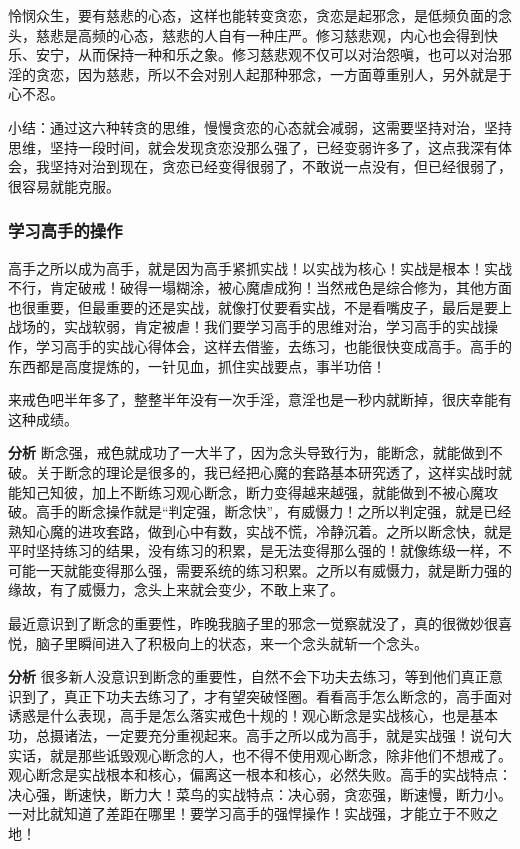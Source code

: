 怜悯众生，要有慈悲的心态，这样也能转变贪恋，贪恋是起邪念，是低频负面的念头，慈悲是高频的心态，慈悲的人自有一种庄严。修习慈悲观，内心也会得到快乐、安宁，从而保持一种和乐之象。修习慈悲观不仅可以对治怨嗔，也可以对治邪淫的贪恋，因为慈悲，所以不会对别人起那种邪念，一方面尊重别人，另外就是于心不忍。

小结：通过这六种转贪的思维，慢慢贪恋的心态就会减弱，这需要坚持对治，坚持思维，坚持一段时间，就会发现贪恋没那么强了，已经变弱许多了，这点我深有体会，我坚持对治到现在，贪恋已经变得很弱了，不敢说一点没有，但已经很弱了，很容易就能克服。

\subsubsection{学习高手的操作}

高手之所以成为高手，就是因为高手紧抓实战！以实战为核心！实战是根本！实战不行，肯定破戒！破得一塌糊涂，被心魔虐成狗！当然戒色是综合修为，其他方面也很重要，但最重要的还是实战，就像打仗要看实战，不是看嘴皮子，最后是要上战场的，实战软弱，肯定被虐！我们要学习高手的思维对治，学习高手的实战操作，学习高手的实战心得体会，这样去借鉴，去练习，也能很快变成高手。高手的东西都是高度提炼的，一针见血，抓住实战要点，事半功倍！

\begin{case}
    来戒色吧半年多了，整整半年没有一次手淫，意淫也是一秒内就断掉，很庆幸能有这种成绩。

    \textbf{分析} 断念强，戒色就成功了一大半了，因为念头导致行为，能断念，就能做到不破。关于断念的理论是很多的，我已经把心魔的套路基本研究透了，这样实战时就能知己知彼，加上不断练习观心断念，断力变得越来越强，就能做到不被心魔攻破。高手的断念操作就是“判定强，断念快”，有威慑力！之所以判定强，就是已经熟知心魔的进攻套路，做到心中有数，实战不慌，冷静沉着。之所以断念快，就是平时坚持练习的结果，没有练习的积累，是无法变得那么强的！就像练级一样，不可能一天就能变得那么强，需要系统的练习积累。之所以有威慑力，就是断力强的缘故，有了威慑力，念头上来就会变少，不敢上来了。
\end{case}

\begin{case}
    最近意识到了断念的重要性，昨晚我脑子里的邪念一觉察就没了，真的很微妙很喜悦，脑子里瞬间进入了积极向上的状态，来一个念头就斩一个念头。

    \textbf{分析} 很多新人没意识到断念的重要性，自然不会下功夫去练习，等到他们真正意识到了，真正下功夫去练习了，才有望突破怪圈。看看高手怎么断念的，高手面对诱惑是什么表现，高手是怎么落实戒色十规的！观心断念是实战核心，也是基本功，总摄诸法，一定要充分重视起来。高手之所以成为高手，就是实战强！说句大实话，就是那些诋毁观心断念的人，也不得不使用观心断念，除非他们不想戒了。观心断念是实战根本和核心，偏离这一根本和核心，必然失败。高手的实战特点：决心强，断速快，断力大！菜鸟的实战特点：决心弱，贪恋强，断速慢，断力小。一对比就知道了差距在哪里！要学习高手的强悍操作！实战强，才能立于不败之地！
\end{case}

